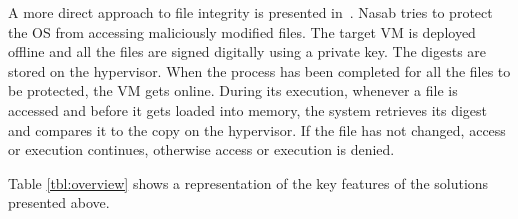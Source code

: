 \par A more direct approach to file integrity is presented in~\cite{nasab2012security}. Nasab tries to protect the \ac{OS} from accessing maliciously modified files. The target \ac{VM} is deployed offline and all the files are signed digitally using a private key. The digests are stored on the hypervisor. When the process has been completed for all the files to be protected, the \ac{VM} gets online. During its execution, whenever a file is accessed and before it gets loaded into memory, the system retrieves its digest and compares it to the copy on the hypervisor. If the file has not changed, access or execution continues, otherwise access or execution is denied.

\par Table \ref{tbl:overview} shows a representation of the key features of the solutions presented above.

